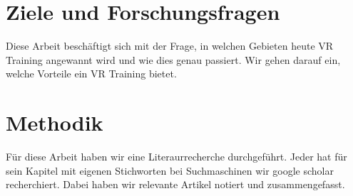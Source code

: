 \section{Ziele und Forschungsfragen}\label{sec:intro_1}
Diese Arbeit beschäftigt sich mit der Frage, in welchen Gebieten heute VR Training angewannt wird und wie dies genau passiert. Wir gehen darauf ein, welche Vorteile ein VR Training bietet.

\section{Methodik}\label{sec:intro_2}
Für diese Arbeit haben wir eine Literaurrecherche durchgeführt. Jeder hat für sein Kapitel mit eigenen Stichworten bei Suchmaschinen wir google scholar recherchiert. Dabei haben wir relevante Artikel notiert und zusammengefasst.